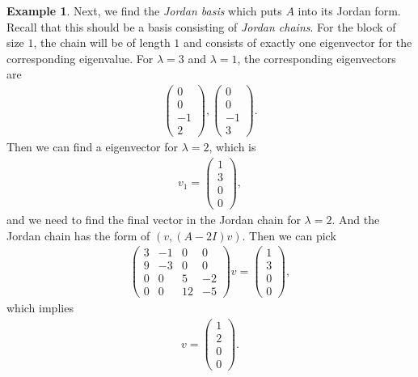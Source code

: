 \documentclass[10pt]{book}
\theoremstyle{definition}
\newtheorem{example}{Example}[chapter]
\numberwithin{equation}{chapter}
\begin{document}
\begin{example}
Next, we find the \emph{Jordan basis} which puts $A$ into its Jordan form. Recall that this should be a basis consisting of \emph{Jordan chains}. For the block of size $1$, the chain will be of length $1$ and consists of exactly one eigenvector for the corresponding eigenvalue. For $\lambda = 3$ and $\lambda = 1$, the corresponding eigenvectors are 
\begin{align*}
    \begin{pmatrix}
    0 \\
    0 \\
    -1 \\
    2
    \end{pmatrix}, \begin{pmatrix}
    0 \\
    0 \\
    -1 \\
    3
    \end{pmatrix}.
\end{align*}
Then we can find a eigenvector for $\lambda = 2$, which is 
\begin{align*}
    v_1 = \begin{pmatrix}
    1 \\
    3 \\
    0 \\
    0
    \end{pmatrix},
\end{align*}
and we need to find the final vector in the Jordan chain for $\lambda = 2$. And the Jordan chain has the form of $(v, (A-2I)v)$. Then we can pick 
\begin{align*}
    \begin{pmatrix}
    3 & -1 & 0 & 0 \\
    9 & -3 & 0 & 0 \\
    0 & 0 & 5 & -2 \\
    0 & 0 & 12 & -5
    \end{pmatrix} v = \begin{pmatrix}
    1 \\
    3 \\
    0 \\
    0
    \end{pmatrix},
\end{align*}
which implies 
\begin{align*}
    v = \begin{pmatrix}
    1 \\
    2 \\
    0 \\
    0
    \end{pmatrix}.

\end{align*}
\end{example}
\end{document}
